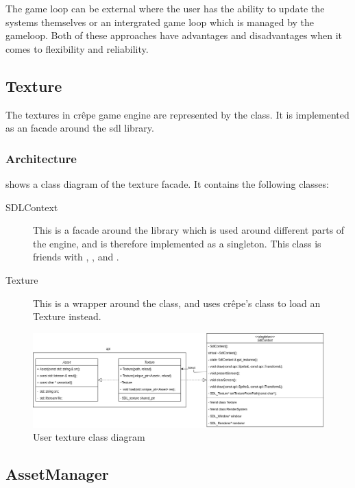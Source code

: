 \documentclass{projdoc}
\begin{document}
The game loop can be external where the user has the ability to update the systems
themselves or an intergrated game loop which is managed by the gameloop. Both of
these approaches have advantages and disadvantages when it comes to flexibility and
reliability.

\subsection{Texture}

The textures in cr\^epe game engine are represented by the  class. It
is implemented as an \gls{facade} around the \gls{sdl} library.

\subsubsection{Architecture}

 shows a class diagram of the texture \gls{facade}. It
contains the following classes:\noparbreak
\begin{description}
	\item[SDLContext] This is a facade around the  library which is
		used around different parts of the engine, and is therefore implemented as a
		singleton. This class is friends with ,
		,  and
		.
	\item[Texture] This is a wrapper around the  class, and
		uses cr\^epe's  class to load an Texture instead.
\end{description}

\begin{figure}
	\centering
	\includegraphics[width=\textwidth]{img/texture.png}
	\caption{User texture class diagram}
	\label{fig:class-texture}
\end{figure}

\subsection{AssetManager}
\end{document}
